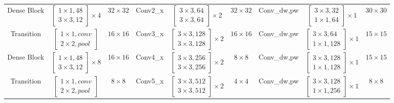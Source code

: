 \begin{table}[width=2\linewidth]
\begin{tabular*}{\tblwidth}{CCC|CCC|CCC}
Dense Block& $\begin{bmatrix}1\times1,48\\3\times3,12\end{bmatrix}\times4$ &$32\times32$&
Conv2\_x& $\begin{bmatrix}3\times3,64\\3\times3,64\end{bmatrix}\times2$& $32\times32$&
Conv\_dw,pw&$\begin{bmatrix}3\times3,32\\1\times1,64\end{bmatrix}\times1$ & $30\times30$\\ 
Transition& $\begin{bmatrix}1\times1,conv\\2\times2,pool\end{bmatrix}$&$16\times16$&
Conv3\_x& $\begin{bmatrix}3\times3,128\\3\times3,128\end{bmatrix}\times2$& $16\times16$&
Conv\_dw,pw&$\begin{bmatrix}3\times3,64\\1\times1,128\end{bmatrix}\times1$ & $15\times15$\\ 
Dense Block& $\begin{bmatrix}1\times1,48\\3\times3,12\end{bmatrix}\times8$ &$16\times16$&
Conv4\_x& $\begin{bmatrix}3\times3,256\\3\times3,256\end{bmatrix}\times2$& $8\times8$&
Conv\_dw,pw&$\begin{bmatrix}3\times3,128\\1\times1,128\end{bmatrix}\times1$ & $15\times15$\\
Transition& $\begin{bmatrix}1\times1,conv\\2\times2,pool\end{bmatrix}$&$8\times8$&
Conv5\_x& $\begin{bmatrix}3\times3,512\\3\times3,512\end{bmatrix}\times2$& $4\times4$&
Conv\_dw,pw&$\begin{bmatrix}3\times3,128\\1\times1,256\end{bmatrix}\times1$ & $8\times8$ \\ 

\end{tabular*}
\end{table}
